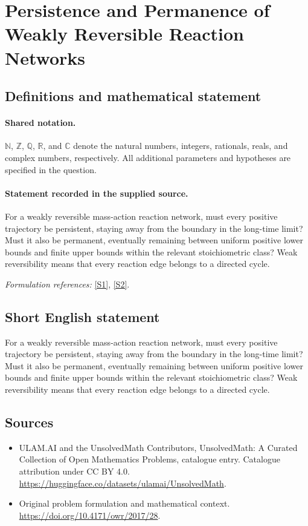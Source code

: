 \documentclass[11pt]{article}
\newcommand{\sref}[2]{\hyperlink{source:#1:#2}{[S#2]}}
\begin{document}
\section{Persistence and Permanence of Weakly Reversible Reaction Networks}\label{statement}

\subsection{Definitions and mathematical statement}

\paragraph{Shared notation.}$\mathbb N$, $\mathbb Z$, $\mathbb Q$, $\mathbb R$, and $\mathbb C$ denote the natural numbers, integers, rationals, reals, and complex numbers, respectively. All additional parameters and hypotheses are specified in the question.


\paragraph{Statement recorded in the supplied source.}
For a weakly reversible mass-action reaction network, must every positive trajectory be persistent, staying away from the boundary in the long-time limit? Must it also be permanent, eventually remaining between uniform positive lower bounds and finite upper bounds within the relevant stoichiometric class? Weak reversibility means that every reaction edge belongs to a directed cycle.
\par\smallskip\textit{Formulation references:} \sref{statement}{1}, \sref{statement}{2}.
\subsection{Short English statement}
For a weakly reversible mass-action reaction network, must every positive trajectory be persistent, staying away from the boundary in the long-time limit? Must it also be permanent, eventually remaining between uniform positive lower bounds and finite upper bounds within the relevant stoichiometric class? Weak reversibility means that every reaction edge belongs to a directed cycle.
\subsection{Sources}
\begin{itemize}
\item[\hypertarget{source:statement:1}{S1}] ULAM.AI and the UnsolvedMath Contributors, UnsolvedMath: A Curated Collection of Open Mathematics Problems, catalogue entry. Catalogue attribution under CC BY 4.0.
\url{https://huggingface.co/datasets/ulamai/UnsolvedMath}.
\item[\hypertarget{source:statement:2}{S2}] Original problem formulation and mathematical context.
\url{https://doi.org/10.4171/owr/2017/28}.
\end{itemize}
\label{end:statement}
\end{document}
